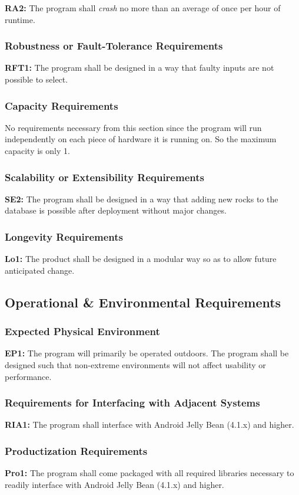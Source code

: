 \documentclass[titlepage]{article}
\begin{document}
\noindent\textbf{RA2:} The program shall \textit{crash} no more than an average of once per hour of runtime.
\subsubsection{Robustness or Fault-Tolerance Requirements}
\textbf{RFT1:} The program shall be designed in a way that faulty inputs are not possible to select.
\subsubsection{Capacity Requirements}
No requirements necessary from this section since the program will run independently on each piece of hardware it is running on. So the maximum capacity is only 1.
\subsubsection{Scalability or Extensibility Requirements}
\textbf{SE2:} The program shall be designed in a way that adding new rocks to the database is possible after deployment without major changes.
\subsubsection{Longevity Requirements}
\textbf{Lo1:} The product shall be designed in a modular way so as to allow future anticipated change.

\subsection{Operational \& Environmental Requirements}
\subsubsection{Expected Physical Environment}
\textbf{EP1:} The program will primarily be operated outdoors. The program shall be designed such that non-extreme environments will not affect usability or performance.
\subsubsection{Requirements for Interfacing with Adjacent Systems}
\textbf{RIA1:} The program shall interface with Android Jelly Bean (4.1.x) and higher.
\subsubsection{Productization Requirements}
\textbf{Pro1:} The program shall come packaged with all required libraries necessary to readily interface with Android Jelly Bean (4.1.x) and higher.
\end{document}
